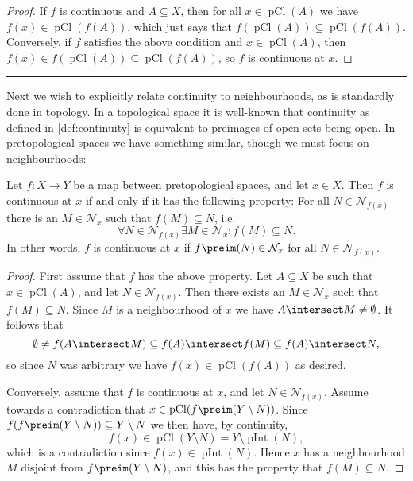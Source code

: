 \documentclass[article, a4paper, 11pt, oneside]{memoir}
\numberwithin{equation}{chapter}
\newcommand{\calN}{\mathcal{N}}
\newcommand{\nhoods}[1]{\calN_{#1}}
\newcommand{\pInt}[1]{\operatorname{pInt}(#1)}
\newcommand{\pCl}[1]{\operatorname{pCl}(#1)}
\newcommand\fleuronbreak{\fancybreak{\textcolor{linkcolor}{\adfhangingflatleafleft}}}
\begin{document}
\begin{proof}
    If $f$ is continuous and $A \subseteq X$, then for all $x \in \pCl{A}$ we have $f(x) \in \pCl{f(A)}$, which just says that $f(\pCl{A}) \subseteq \pCl{f(A)}$. Conversely, if $f$ satisfies the above condition and $x \in \pCl{A}$, then $f(x) \in f(\pCl{A}) \subseteq \pCl{f(A)}$, so $f$ is continuous at $x$.
\end{proof}

\fleuronbreak

Next we wish to explicitly relate continuity to neighbourhoods, as is standardly done in topology. In a topological space it is well-known that continuity as defined in \cref{def:continuity} is equivalent to preimages of open sets being open. In pretopological spaces we have something similar, though we must focus on neighbourhoods:

\begin{proposition}
    \label{thm:continuity-by-neighbourhoods}
    Let $f \colon X \to Y$ be a map between pretopological spaces, and let $x \in X$. Then $f$ is continuous at $x$ if and only if it has the following property: For all $N \in \nhoods{f(x)}$ there is an $M \in \nhoods{x}$ such that $f(M) \subseteq N$, i.e.
    \begin{equation*}
        \forall N \in \nhoods{f(x)} \exists M \in \nhoods{x} \colon f(M) \subseteq N.
    \end{equation*}
    In other words, $f$ is continuous at $x$ if $f\preim(N) \in \nhoods{x}$ for all $N \in \nhoods{f(x)}$.
\end{proposition}

\begin{proof}
    First assume that $f$ has the above property. Let $A \subseteq X$ be such that $x \in \pCl{A}$, and let $N \in \nhoods{f(x)}$. Then there exists an $M \in \nhoods{x}$ such that $f(M) \subseteq N$. Since $M$ is a neighbourhood of $x$ we have $A \intersect M \neq \emptyset$. It follows that
    \begin{equation*}
        \emptyset
            \neq f(A \intersect M)
            \subseteq f(A) \intersect f(M)
            \subseteq f(A) \intersect N,
    \end{equation*}
    so since $N$ was arbitrary we have $f(x) \in \pCl{f(A)}$ as desired.

    Conversely, assume that $f$ is continuous at $x$, and let $N \in \nhoods{f(x)}$. Assume towards a contradiction that $x \in \pCl{f\preim(Y \setminus N)}$. Since $f(f\preim(Y \setminus N)) \subseteq Y \setminus N$ we then have, by continuity,
    \begin{equation*}
        f(x)
            \in \pCl{Y \setminus N}
            = Y \setminus \pInt{N},
    \end{equation*}
    which is a contradiction since $f(x) \in \pInt{N}$. Hence $x$ has a neighbourhood $M$ disjoint from $f\preim(Y \setminus N)$, and this has the property that $f(M) \subseteq N$.
\end{proof}
\end{document}
